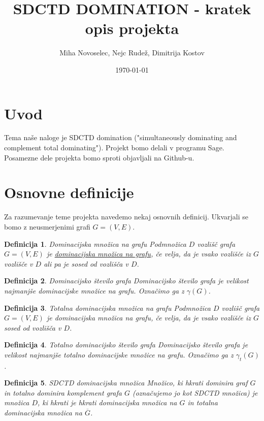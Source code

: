 \documentclass[12pt]{article}
\title{SDCTD DOMINATION - kratek opis projekta}
\author{Miha Novoselec, Nejc Rudež, Dimitrija Kostov}
\date{\today}
\newtheorem{definition}{Definicija}
\begin{document}
\maketitle

\section{Uvod}
Tema naše naloge je SDCTD domination ("simultaneously dominating and complement total dominating"). Projekt bomo delali v programu Sage. Posamezne dele projekta bomo sproti objavljali na Github-u. 

\section{Osnovne definicije}
Za razumevanje teme projekta navedemo nekaj osnovnih definicij. Ukvarjali se bomo z neusmerjenimi grafi $G = (V, E)$.
\begin{definition}{Dominacijska množica na grafu}
    Podmnožica $D$ vozlišč grafa $G = (V, E)$ je \underline{dominacijska množica na grafu}, če velja, da je vsako vozlišče iz $G$ vozlišče v $D$ ali pa je sosed od vozlišča v $D$.
\end{definition}

\begin{definition}{Dominacijsko število grafa}
    Dominacijsko število grafa je velikost najmanjše dominacijske množice na grafu. Označimo ga z $\gamma(G)$.
\end{definition}

\begin{definition}{Totalna dominacijska množica na grafu}
    Podmnožica $D$ vozlišč grafa $G = (V, E)$ je dominacijska množica na grafu, če velja, da je vsako vozlišče iz $G$ sosed od vozlišča v $D$.
\end{definition}

\begin{definition}{Totalno dominacijsko število grafa}
    Dominacijsko število grafa je velikost najmanjše totalno dominacijske množice na grafu. Označimo ga z $\gamma_t(G)$.
\end{definition}

\begin{definition}{SDCTD dominacijska množica}
    Množico, ki hkrati dominira graf $G$ in totalno dominira komplement grafa $G$ (označujemo jo kot SDCTD množica) je množica $D$, 
    ki hkrati je hkrati dominacijska množica na $G$ in totalna dominacijska množica na $\overline{G}$.
\end{definition}
\end{document}
